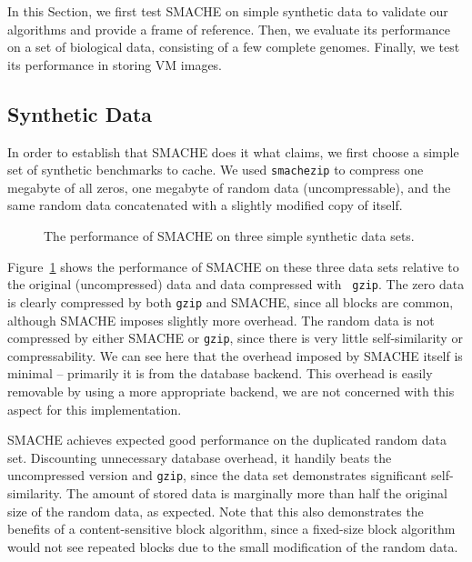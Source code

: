 \documentclass{sigplanconf}[11pt]
\begin{document}
In this Section, we first test SMACHE on simple synthetic data to validate our
algorithms and provide a frame of reference.  Then, we evaluate its performance
on a set of biological data, consisting of a few complete genomes.  Finally, we
test its performance in storing VM images.

\subsection{Synthetic Data}

In order to establish that SMACHE does it what claims, we first choose a simple
set of synthetic benchmarks to cache.  We used {\tt smachezip} to compress one
megabyte of all zeros, one megabyte of random data (uncompressable), and the
same random data concatenated with a slightly modified copy of itself.

\begin{figure}[htb]
\begin{center}
\hspace{-0.25in}
\hspace{-0.25in}
\caption{\label{fig:synthetic}The performance of SMACHE on three simple synthetic data sets.}
\end{center}
\end{figure}

Figure~\ref{fig:synthetic} shows the performance of SMACHE on these three data
sets relative to the original (uncompressed) data and data compressed with {\tt
gzip}.  The zero data is clearly compressed by both {\tt gzip} and SMACHE,
since all blocks are common, although SMACHE imposes slightly more overhead.
The random data is not compressed by either SMACHE or {\tt gzip}, since there
is very little self-similarity or compressability.  We can see here that the
overhead imposed by SMACHE itself is minimal -- primarily it is from the
database backend.  This overhead is easily removable by using a more
appropriate backend, we are not concerned with this aspect for this
implementation.

SMACHE achieves expected good performance on the duplicated random data set.
Discounting unnecessary database overhead, it handily beats the uncompressed
version and {\tt gzip}, since the data set demonstrates significant
self-similarity.  The amount of stored data is marginally more than half the
original size of the random data, as expected.  Note that this also
demonstrates the benefits of a content-sensitive block algorithm, since a
fixed-size block algorithm would not see repeated blocks due to the small
modification of the random data.
\end{document}

